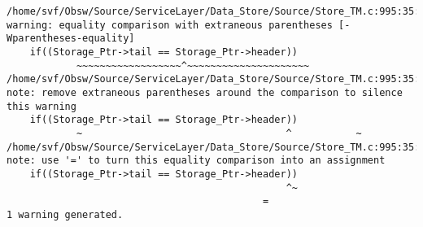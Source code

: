 
\noindent\begin{minipage}{\textwidth}
\begin{lstlisting}[language={}, caption=9th warning example., label=srciror_9]
/home/svf/Obsw/Source/ServiceLayer/Data_Store/Source/Store_TM.c:995:35: warning: equality comparison with extraneous parentheses [-Wparentheses-equality]
	if((Storage_Ptr->tail == Storage_Ptr->header)) 
			~~~~~~~~~~~~~~~~~~^~~~~~~~~~~~~~~~~~~~~~
/home/svf/Obsw/Source/ServiceLayer/Data_Store/Source/Store_TM.c:995:35: note: remove extraneous parentheses around the comparison to silence this warning
	if((Storage_Ptr->tail == Storage_Ptr->header)) 
			~									^			~
/home/svf/Obsw/Source/ServiceLayer/Data_Store/Source/Store_TM.c:995:35: note: use '=' to turn this equality comparison into an assignment
	if((Storage_Ptr->tail == Storage_Ptr->header)) 
												^~
						  					=
1 warning generated.
\end{lstlisting}
\end{minipage}